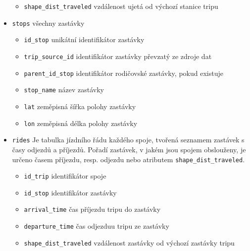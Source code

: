 \begin{itemize}
\begin{itemize}
\item \verb-shape_dist_traveled- vzdálenost ujetá od výchozí stanice tripu


\end{itemize}


\item \verb-stops- všechny zastávky


\begin{itemize}
\item \verb-id_stop- unikátní identifikátor zastávky


\item \verb-trip_source_id- identifikátor zastávky převzatý ze zdroje dat


\item \verb-parent_id_stop- identifikátor rodičovské zastávky, pokud existuje


\item \verb-stop_name- název zastávky


\item \verb-lat- zeměpisná šířka polohy zastávky


\item \verb-lon- zeměpisná délka polohy zastávky


\end{itemize}


\item \verb-rides- Je tabulka jízdního řádu každého spoje, tvořená seznamem zastávek s časy odjezdů a příjezdů. Pořadí zastávek, v jakém jsou spojem obslouženy, je určeno časem příjezdu, resp. odjezdu nebo atributem \verb-shape_dist_traveled-. \label{table:rides}


\begin{itemize}
\item \verb-id_trip- identifikátor spoje


\item \verb-id_stop- identifikátor zastávky


\item \verb-arrival_time- čas příjezdu tripu do zastávky


\item \verb-departure_time- čas odjezduu tripu ze zastávky


\item \verb-shape_dist_traveled- vzdálenost zastávky od výchozí zastávky tripu


\end{itemize}


\end{itemize}


